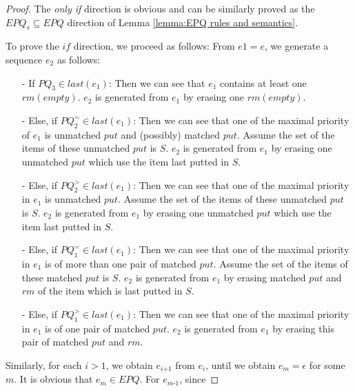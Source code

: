 \begin {proof}

The \textit{only if} direction is obvious and can be similarly proved as the $\textit{EPQ}_s \subseteq \textit{EPQ}$ direction of Lemma \ref{lemma:EPQ rules and semantics}.

To prove the $\textit{if}$ direction, we proceed as follows: From $e1=e$, we generate a sequence $e_2$ as follows:

\begin{itemize}
\setlength{\itemsep}{0.5pt}
\item[-] If $\textit{PQ}_3 \in \textit{last}(e_1)$: Then we can see that $e_1$ contains at least one $\textit{rm}(\textit{empty})$. $e_2$ is generated from $e_1$ by erasing one $\textit{rm}(\textit{empty})$.

\item[-] Else, if $\textit{PQ}_2^{=} \in \textit{last}(e_1)$: Then we can see that one of the maximal priority of $e_1$ is unmatched $\textit{put}$ and (possibly) matched $\textit{put}$. Assume the set of the items of these unmatched $\textit{put}$ is $S$. $e_2$ is generated from $e_1$ by erasing one unmatched $\textit{put}$ which use the item last putted in $S$.

\item[-] Else, if $\textit{PQ}_2^{>} \in \textit{last}(e_1)$: Then we can see that one of the maximal priority in $e_1$ is unmatched $\textit{put}$. Assume the set of the items of these unmatched $\textit{put}$ is $S$. $e_2$ is generated from $e_1$ by erasing one unmatched $\textit{put}$ which use the item last putted in $S$.

\item[-] Else, if $\textit{PQ}_1^{=} \in \textit{last}(e_1)$: Then we can see that one of the maximal priority in $e_1$ is of more than one pair of matched $\textit{put}$. Assume the set of the items of these matched $\textit{put}$ is $S$. $e_2$ is generated from $e_1$ by erasing matched $\textit{put}$ and $\textit{rm}$ of the item which is last putted in $S$.

\item[-] Else, if $\textit{PQ}_1^{>} \in \textit{last}(e_1)$: Then we can see that one of the maximal priority in $e_1$ is of one pair of matched $\textit{put}$. $e_2$ is generated from $e_1$ by erasing this pair of matched $\textit{put}$ and $\textit{rm}$.
\end{itemize}

Similarly, for each $i > 1$, we obtain $e_{\textit{i+1}}$ from $e_i$, until we obtain $e_m = \epsilon$ for some $m$. It is obvious that $e_m \in \textit{EPQ}$. For $e_{\textit{m-1}}$, since


\end{proof}
